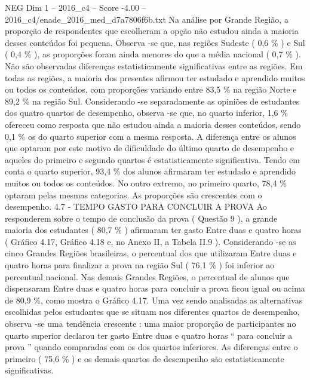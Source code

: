 \begin{textsample}{NEG Dim 1 – 2016\_c4 – Score -4.00 – 2016\_c4/enade\_2016\_med\_d7a7806f6b.txt}
Na análise por Grande Região, a proporção de respondentes que escolheram a opção não estudou ainda a maioria desses conteúdos foi pequena.
Observa -se que, nas regiões Sudeste ( 0,6 \% ) e Sul ( 0,4 \% ), as proporções foram ainda menores do que a média nacional ( 0,7 \% ).
Não são observadas diferenças estatisticamente significativas entre as regiões.
Em todas as regiões, a maioria dos presentes afirmou ter estudado e aprendido muitos ou todos os conteúdos, com proporções variando entre 83,5 \% na região Norte e 89,2 \% na região Sul.
Considerando -se separadamente as opiniões de estudantes dos quatro quartos de desempenho, observa -se que, no quarto inferior, 1,6 \% ofereceu como resposta que não estudou ainda a maioria desses conteúdos, sendo 0,1 \% os do quarto superior com a mesma resposta.
A diferença entre os alunos que optaram por este motivo de dificuldade do último quarto de desempenho e aqueles do primeiro e segundo quartos é estatisticamente significativa.
Tendo em conta o quarto superior, 93,4 \% dos alunos afirmaram ter estudado e aprendido muitos ou todos os conteúdos.
No outro extremo, no primeiro quarto, 78,4 \% optaram pelas mesmas categorias.
As proporções são crescentes com o desempenho. 4.7 - TEMPO GASTO PARA CONCLUIR A PROVA Ao responderem sobre o tempo de conclusão da prova ( Questão 9 ), a grande maioria dos estudantes ( 80,7 \% ) afirmaram ter gasto Entre duas e quatro horas ( Gráfico 4.17, Gráfico 4.18 e, no Anexo II, a Tabela II.9 ).
Considerando -se as cinco Grandes Regiões brasileiras, o percentual dos que utilizaram Entre duas e quatro horas para finalizar a prova na região Sul ( 76,1 \% ) foi inferior ao percentual nacional.
Nas demais Grandes Regiões, o percentual de alunos que dispensaram Entre duas e quatro horas para concluir a prova ficou igual ou acima de 80,9 \%, como mostra o Gráfico 4.17.
Uma vez sendo analisadas as alternativas escolhidas pelos estudantes que se situam nos diferentes quartos de desempenho, observa -se uma tendência crescente : uma maior proporção de participantes no quarto superior declarou ter gasto Entre duas e quatro horas “ para concluir a prova ” quando comparadas com os dos quartos inferiores.
As diferenças entre o primeiro ( 75,6 \% ) e os demais quartos de desempenho são estatisticamente significativas.

\end{textsample}
